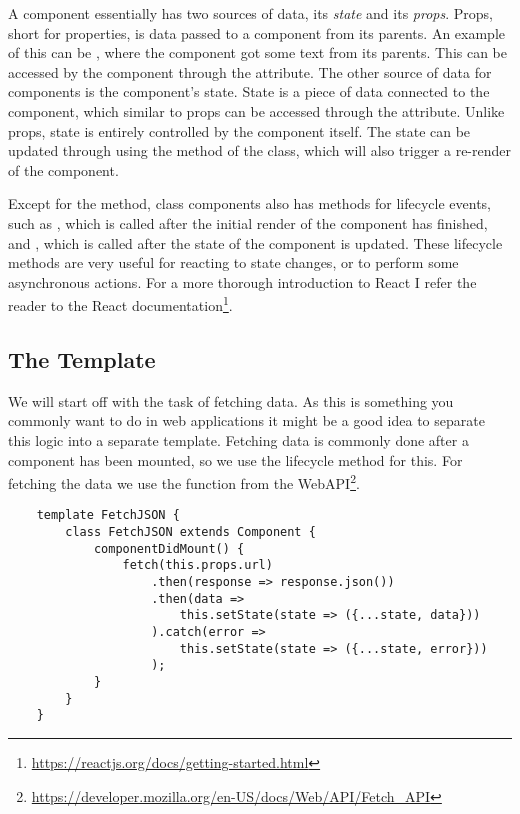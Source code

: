 A component essentially has two sources of data, its \emph{state} and its \emph{props}.
Props, short for properties, is data passed to a component from its parents.
An example of this can be , where the component  got some text from its parents.
This can be accessed by the component through the  attribute.
The other source of data for components is the component's state.
State is a piece of data connected to the component, which similar to props can be accessed through the  attribute.
Unlike props, state is entirely controlled by the component itself.
The state can be updated through using the  method of the  class, which will also trigger a re-render of the component.

Except for the  method, class components also has methods for lifecycle events, such as , which is called after the initial render of the component has finished, and , which is called after the state of the component is updated.
These lifecycle methods are very useful for reacting to state changes, or to perform some asynchronous actions.
For a more thorough introduction to React I refer the reader to the React documentation\footnote{\url{https://reactjs.org/docs/getting-started.html}}.

\subsection{The  Template}\label{subsec:the-fetchjson-template}

We will start off with the task of fetching data.
As this is something you commonly want to do in web applications it might be a good idea to separate this logic into a separate template.
Fetching data is commonly done after a component has been mounted, so we use the  lifecycle method for this.
For fetching the data we use the  function from the WebAPI\footnote{\url{https://developer.mozilla.org/en-US/docs/Web/API/Fetch_API}}.

\begin{verbatim}
    template FetchJSON {
        class FetchJSON extends Component {
            componentDidMount() {
                fetch(this.props.url)
                    .then(response => response.json())
                    .then(data =>
                        this.setState(state => ({...state, data}))
                    ).catch(error =>
                        this.setState(state => ({...state, error}))
                    );
            }
        }
    }
\end{verbatim}


